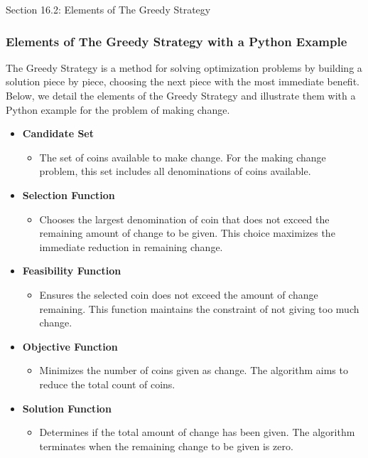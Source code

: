 \begin{notes}{Section 16.2: Elements of The Greedy Strategy}
    \subsubsection*{Elements of The Greedy Strategy with a Python Example}

    The Greedy Strategy is a method for solving optimization problems by building a solution piece by piece, choosing the next piece with the most immediate benefit. Below, we detail the elements of 
    the Greedy Strategy and illustrate them with a Python example for the problem of making change.
    
    \begin{itemize}
        \item \textbf{Candidate Set}
        \begin{itemize}
            \item The set of coins available to make change. For the making change problem, this set includes all denominations of coins available.
        \end{itemize}    
        \item \textbf{Selection Function}
        \begin{itemize}
            \item Chooses the largest denomination of coin that does not exceed the remaining amount of change to be given. This choice maximizes the immediate reduction in remaining change.
        \end{itemize}
        \item \textbf{Feasibility Function}
        \begin{itemize}
            \item Ensures the selected coin does not exceed the amount of change remaining. This function maintains the constraint of not giving too much change.
        \end{itemize}
        \item \textbf{Objective Function}
        \begin{itemize}
            \item Minimizes the number of coins given as change. The algorithm aims to reduce the total count of coins.
        \end{itemize}
        \item \textbf{Solution Function}
        \begin{itemize}
            \item Determines if the total amount of change has been given. The algorithm terminates when the remaining change to be given is zero.
        \end{itemize}
    \end{itemize}
    

\end{notes}
